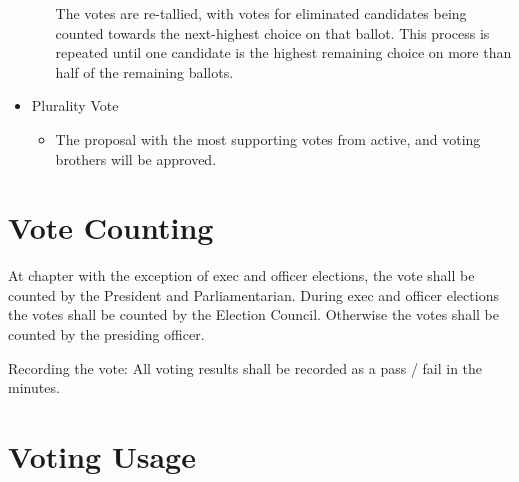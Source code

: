 \begin{itemize}
\begin{itemize}
                The votes are re-tallied, with votes for eliminated candidates
                being counted towards the next-highest choice on that ballot.
                This process is repeated until one candidate is the highest
                remaining choice on more than half of the remaining ballots.
        \end{itemize}
    \item Plurality Vote
        \begin{itemize}
            \item The proposal with the most supporting votes from active, and
                voting brothers will be approved.
        \end{itemize}
\end{itemize}

\section{Vote Counting}
\label{sec:vote-counting}

At chapter with the exception of exec and officer elections, the vote shall be
counted by the President and Parliamentarian.
During exec and officer elections the votes shall be counted by the Election
Council.
Otherwise the votes shall be counted by the presiding officer.

Recording the vote: All voting results shall be recorded as a pass / fail in the
minutes.

\section{Voting Usage}
\label{sec:voting-usage}

